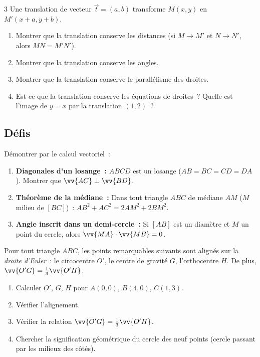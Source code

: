 \begin{probleme}{3}
Une translation de vecteur $\vec{t}=(a,b)$ transforme $M(x,y)$ en $M'(x+a,y+b)$.
\begin{enumerate}
  \item Montrer que la translation conserve les distances (si $M\to M'$
        et $N\to N'$, alors $MN=M'N'$).
  \item Montrer que la translation conserve les angles.
  \item Montrer que la translation conserve le parall\'elisme des droites.
  \item Est-ce que la translation conserve les \'equations de droites~?
        Quelle est l'image de $y=x$ par la translation $(1,2)$~?
\end{enumerate}
\end{probleme}

\subsection*{D\'efis}

\begin{challenge}
D\'emontrer par le calcul vectoriel~:
\begin{enumerate}
  \item \textbf{Diagonales d'un losange~:} $ABCD$ est un losange
        ($AB=BC=CD=DA$). Montrer que $\vv{AC}\perp\vv{BD}$.
  \item \textbf{Th\'eor\`eme de la m\'ediane~:} Dans tout triangle $ABC$
        de m\'ediane $AM$ ($M$ milieu de $[BC]$)~:
        $AB^2+AC^2 = 2AM^2+2BM^2$.
  \item \textbf{Angle inscrit dans un demi-cercle~:}
        Si $[AB]$ est un diam\`etre et $M$ un point du cercle,
        alors $\vv{MA}\cdot\vv{MB}=0$.
\end{enumerate}
\end{challenge}

\begin{challenge}
Pour tout triangle $ABC$, les points remarquables suivants sont align\'es
sur la \emph{droite d'Euler}~: le circocentre $O'$, le centre de gravité $G$, l'orthocentre $H$.
De plus, $\vv{O'G} = \frac{1}{3}\vv{O'H}$.
\begin{enumerate}
  \item Calculer $O'$, $G$, $H$ pour $A(0,0)$, $B(4,0)$, $C(1,3)$.
  \item V\'erifier l'alignement.
  \item V\'erifier la relation $\vv{O'G} = \frac{1}{3}\vv{O'H}$.
  \item Chercher la signification g\'eom\'etrique du cercle des neuf points
        (cercle passant par les milieux des c\^ot\'es).
\end{enumerate}
\end{challenge}

